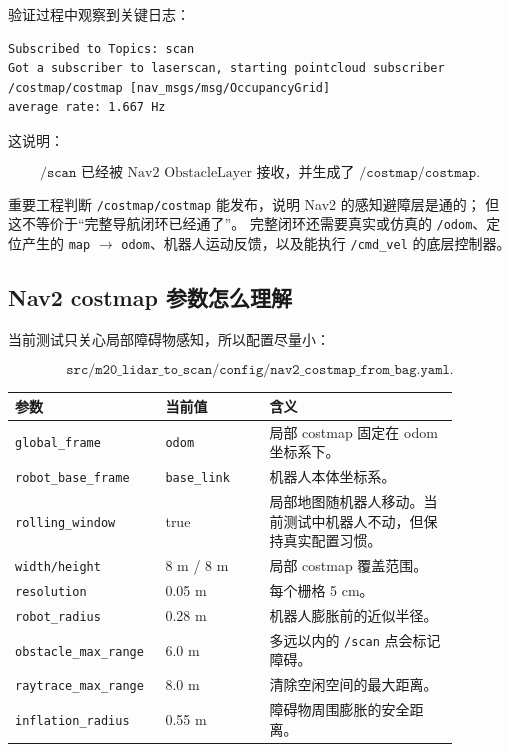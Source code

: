 \documentclass[UTF8,11pt,a4paper]{ctexart}
\begin{document}
验证过程中观察到关键日志：

\begin{verbatim}
Subscribed to Topics: scan
Got a subscriber to laserscan, starting pointcloud subscriber
/costmap/costmap [nav_msgs/msg/OccupancyGrid]
average rate: 1.667 Hz
\end{verbatim}

这说明：

\[
\boxed{
\texttt{/scan}
\text{ 已经被 Nav2 ObstacleLayer 接收，并生成了 }
\texttt{/costmap/costmap}.
}
\]

\begin{orangebox}{重要工程判断}
\texttt{/costmap/costmap} 能发布，说明 Nav2 的感知避障层是通的；
但这不等价于“完整导航闭环已经通了”。
完整闭环还需要真实或仿真的 \texttt{/odom}、定位产生的 \texttt{map} \(\rightarrow\) \texttt{odom}、机器人运动反馈，以及能执行 \texttt{/cmd\_vel} 的底层控制器。
\end{orangebox}

\subsection{Nav2 costmap 参数怎么理解}

当前测试只关心局部障碍物感知，所以配置尽量小：

\[
\texttt{src/m20\_lidar\_to\_scan/config/nav2\_costmap\_from\_bag.yaml}.
\]

\begin{center}
\renewcommand{\arraystretch}{1.25}
\begin{tabular}{p{0.26\linewidth}p{0.22\linewidth}p{0.40\linewidth}}
\toprule
\textbf{参数} & \textbf{当前值} & \textbf{含义}\\
\midrule
\texttt{global\_frame} & \texttt{odom} & 局部 costmap 固定在 odom 坐标系下。\\
\texttt{robot\_base\_frame} & \texttt{base\_link} & 机器人本体坐标系。\\
\texttt{rolling\_window} & true & 局部地图随机器人移动。当前测试中机器人不动，但保持真实配置习惯。\\
\texttt{width/height} & 8 m / 8 m & 局部 costmap 覆盖范围。\\
\texttt{resolution} & 0.05 m & 每个栅格 5 cm。\\
\texttt{robot\_radius} & 0.28 m & 机器人膨胀前的近似半径。\\
\texttt{obstacle\_max\_range} & 6.0 m & 多远以内的 \texttt{/scan} 点会标记障碍。\\
\texttt{raytrace\_max\_range} & 8.0 m & 清除空闲空间的最大距离。\\
\texttt{inflation\_radius} & 0.55 m & 障碍物周围膨胀的安全距离。\\
\bottomrule
\end{tabular}
\end{center}
\end{document}
